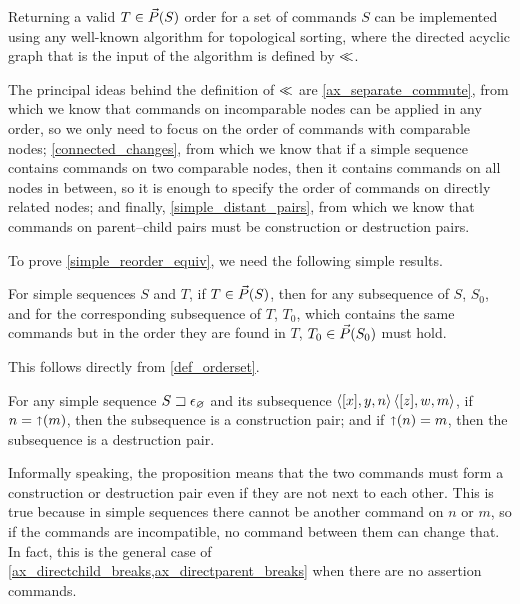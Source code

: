 Returning a valid $T\in\vec{P}({S})$ order for a set of commands $S$
can be implemented using any well-known algorithm for topological sorting,
where the directed acyclic graph that is the input of the algorithm is defined by $\ll$.

The principal ideas behind the definition of $\ll$ are 
\cref{ax_separate_commute}, from which we know that commands on incomparable
nodes can be applied in any order, so we only need to focus on the order of commands
with comparable nodes;
\cref{connected_changes}, from which we know that if a simple sequence contains commands on two comparable
nodes, then it contains commands on all nodes in between, so it is enough to specify
the order of commands on directly related nodes;
and finally, \cref{simple_distant_pairs}, from which we know
that commands on parent--child pairs must be construction or destruction pairs.

To prove \cref{simple_reorder_equiv}, we need the following simple results.

\begin{mycor}
For simple sequences $S$ and $T$,
if $T\in\vec{P}({S})$, then for any subsequence of $S$, $S_0$,
and for the corresponding subsequence of $T$, $T_0$, which
contains the same commands but in the order they are found in $T$,
$T_0\in\vec{P}({S_0})$ must hold.
\end{mycor}

This follows directly from \cref{def_orderset}.

\begin{mylem}
For any simple sequence ${S}\sqsupset\epsilon_\varnothing$ and its subsequence $\langle{[x],y,n}\rangle\,\allowbreak\langle{[z],w,m}\rangle$,
if $n=\mathord{\shortuparrow}(m)$, then the subsequence is a construction pair;
and if $\mathord{\shortuparrow}(n)=m$, then the subsequence is a destruction pair.
\end{mylem}

Informally speaking, the proposition means that
the two commands must form a construction or destruction pair even
if they are not next to each other.
This is true because in simple sequences
there cannot be another command on $n$ or $m$,
so if the commands are incompatible, no command between them can change that.
In fact, this  is the general case
of \cref{ax_directchild_breaks,ax_directparent_breaks} when there are no assertion commands.

